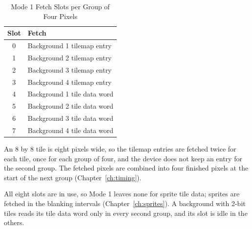 \begin{table}[H]
	\centering
	\begin{tabular}{cl}
		\toprule
		\textbf{Slot} & \textbf{Fetch}              \\
		\midrule
		0             & Background 1 tilemap entry  \\
		1             & Background 2 tilemap entry  \\
		2             & Background 3 tilemap entry  \\
		3             & Background 4 tilemap entry  \\
		4             & Background 1 tile data word \\
		5             & Background 2 tile data word \\
		6             & Background 3 tile data word \\
		7             & Background 4 tile data word \\
		\bottomrule
	\end{tabular}
	\caption{Mode 1 Fetch Slots per Group of Four Pixels}
	\label{tab:m1-slots}
\end{table}

An 8 by 8 tile is eight pixels wide, so the tilemap entries are fetched twice for each tile, once for each group of
four, and the device does not keep an entry for the second group. The fetched pixels are combined into four finished
pixels at the start of the next group (Chapter~\ref{ch:timing}).

All eight slots are in use, so Mode 1 leaves none for sprite tile data; sprites are fetched in the blanking intervals
(Chapter~\ref{ch:sprites}). A background with 2-bit tiles reads its tile data word only in every second group, and its
slot is idle in the others.
